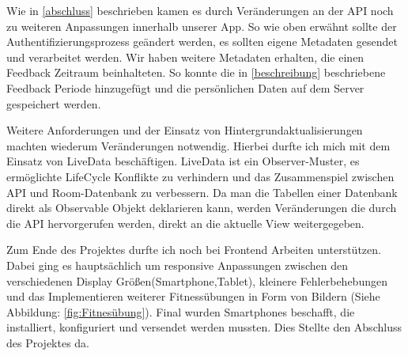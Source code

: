 Wie in \ref{abschluss} beschrieben kamen es durch Veränderungen an der API noch zu weiteren Anpassungen innerhalb unserer App. So wie oben erwähnt sollte der Authentifizierungsprozess geändert werden, es sollten eigene Metadaten gesendet und verarbeitet werden. Wir haben weitere Metadaten erhalten, die einen Feedback Zeitraum beinhalteten. So konnte die in \ref{beschreibung} beschriebene Feedback Periode hinzugefügt und die persönlichen Daten auf dem Server gespeichert werden.


Weitere Anforderungen und der Einsatz von Hintergrundaktualisierungen machten wiederum Veränderungen notwendig. Hierbei durfte ich mich mit dem Einsatz von LiveData beschäftigen. LiveData ist ein Observer-Muster, es ermöglichte  LifeCycle Konflikte zu verhindern und das Zusammenspiel zwischen API und Room-Datenbank zu verbessern. Da man die Tabellen einer Datenbank direkt als Observable Objekt deklarieren kann, werden Veränderungen die durch die  API hervorgerufen werden, direkt  an die aktuelle View weitergegeben.

Zum Ende des Projektes durfte ich  noch bei Frontend Arbeiten unterstützen. Dabei ging es hauptsächlich um responsive Anpassungen zwischen den verschiedenen Display Größen(Smartphone,Tablet), kleinere Fehlerbehebungen und das Implementieren weiterer Fitnessübungen in Form von Bildern (Siehe Abbildung: \ref{fig:Fitnesübung}).
Final wurden Smartphones beschafft, die installiert, konfiguriert und versendet werden mussten. Dies Stellte den Abschluss des Projektes da.









